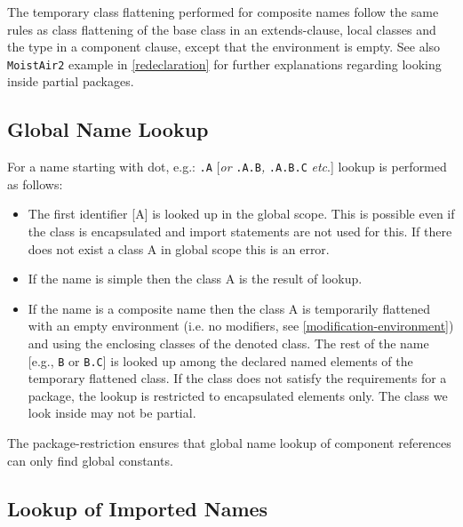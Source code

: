 \begin{nonnormative}
The temporary class flattening performed for composite names
follow the same rules as class flattening of the base class in an
extends-clause, local classes and the type in a component clause, except
that the environment is empty. See also \lstinline!MoistAir2! example in
\autoref{redeclaration} for further explanations regarding looking inside
partial packages.
\end{nonnormative}

\subsection{Global Name Lookup}

For a name starting with dot, e.g.: \lstinline!.A! {[}\emph{or} \lstinline!.A.B!\emph{,}
\lstinline!.A.B.C!
\emph{etc}.{]} lookup is performed as follows:
\begin{itemize}
\item
  The first identifier [A] is looked up in the global scope. This is
  possible even if the class is encapsulated and import statements are
  not used for this. If there does not exist a class A in global scope
  this is an error.
\item
  If the name is simple then the class A is the result of lookup.
\item
  If the name is a composite name then the class A is temporarily
  flattened with an empty environment (i.e. no modifiers, see
  \autoref{modification-environment}) and using the enclosing classes of the denoted class. The rest
  of the name [e.g., \lstinline!B! or \lstinline!B.C!] is looked up among the declared named
  elements of the temporary flattened class. If the class does not
  satisfy the requirements for a package, the lookup is restricted to
  encapsulated elements only. The class we look inside may not be
  partial.
\end{itemize}

\begin{nonnormative}
The package-restriction ensures that global name lookup of
component references can only find global constants.
\end{nonnormative}

\subsection{Lookup of Imported Names}


